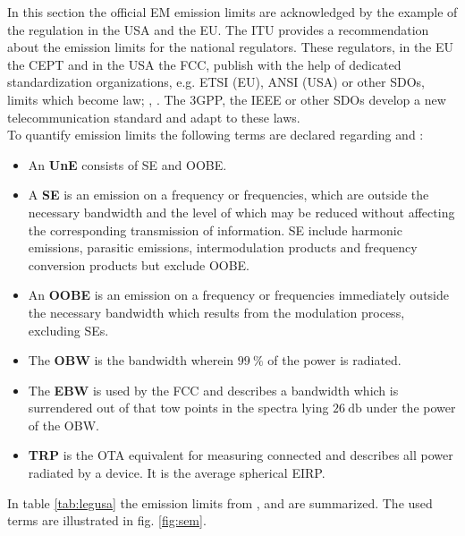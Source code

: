 In this section the official \ac{EM} emission limits are acknowledged by the example of the regulation in the \ac{USA} and the \ac{EU}. The \ac{ITU} provides a recommendation \cite{seitur} about the emission limits for the national regulators. These regulators, in the \ac{EU} the \ac{CEPT} and in the \ac{USA} the \ac{FCC}, publish with the help of dedicated standardization organizations, e.g. \ac{ETSI} (\ac{EU}), \ac{ANSI} (\ac{USA}) or other \acp{SDO}, limits which become law; \cite{ceptercrec}, \cite{ansi}. The \ac{3GPP}, the \ac{IEEE} or other \acp{SDO} develop a new telecommunication standard and adapt to these laws.\\
To quantify emission limits the following terms are declared regarding \cite{seitur} and \cite{ctiaat}:

\begin{itemize}
\item An \textbf{\acf{UnE}} consists of \ac{SE} and \ac{OOBE}.
\item A \textbf{\acf{SE}} is an emission on a frequency or frequencies, which are outside the necessary bandwidth and the level of which may be reduced without affecting the corresponding transmission of information. \acl{SE} include harmonic
emissions, parasitic emissions, intermodulation products and frequency conversion products but exclude \ac{OOBE}.
\item An \textbf{\acf{OOBE}} is an emission on a frequency or frequencies immediately outside the necessary bandwidth which results from the modulation process, excluding \aclp{SE}.
\item The \textbf{\acf{OBW}} is the bandwidth wherein $\SI{99}{\percent}$ of the power is radiated.
\item The \textbf{\acf{EBW}} is used by the \ac{FCC} and describes a bandwidth which is surrendered out of that tow points in the spectra lying $\SI{26}{\decibel}$ under the power of the \ac{OBW}. 
\item \textbf{\acf{TRP}} is the \ac{OTA} equivalent for measuring connected and describes all power radiated by a device. It is the average spherical \ac{EIRP}.
\end{itemize}


In table \ref{tab:legusa} the emission limits from \cite{ceptercrec}, \cite{ansi} and \cite{fcc} are summarized. The used terms are illustrated in fig. \ref{fig:sem}.

